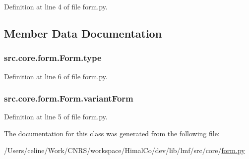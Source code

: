 Definition at line 4 of file form.\+py.



\subsection{Member Data Documentation}
\hypertarget{classsrc_1_1core_1_1form_1_1_form_afc077dc1d02f87ed61603f0ddeaebde8}{
\subsubsection[{type}]{\setlength{\rightskip}{0pt plus 5cm}src.\+core.\+form.\+Form.\+type}}\label{classsrc_1_1core_1_1form_1_1_form_afc077dc1d02f87ed61603f0ddeaebde8}


Definition at line 6 of file form.\+py.

\hypertarget{classsrc_1_1core_1_1form_1_1_form_a0e200dbcf3f01a53844854ae84509c15}{
\subsubsection[{variant\+Form}]{\setlength{\rightskip}{0pt plus 5cm}src.\+core.\+form.\+Form.\+variant\+Form}}\label{classsrc_1_1core_1_1form_1_1_form_a0e200dbcf3f01a53844854ae84509c15}


Definition at line 5 of file form.\+py.



The documentation for this class was generated from the following file\+:\begin{DoxyCompactItemize}
\item 
/\+Users/celine/\+Work/\+C\+N\+R\+S/workspace/\+Himal\+Co/dev/lib/lmf/src/core/\hyperlink{form_8py}{form.\+py}\end{DoxyCompactItemize}
